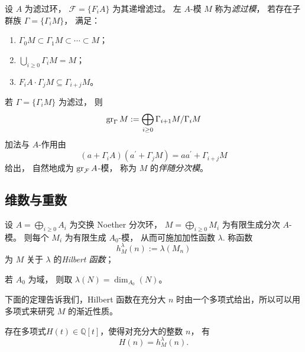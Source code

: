 \documentclass[12pt,a4paper]{ctexrep}   %
\begin{document}
\begin{definition}
    设 $A$ 为滤过环，
    $\mathcal{F}=\{F_iA\}$ 为其递增滤过。
    左 $A$-模 $M$ 称为\emph{滤过模}，
    若存在子群族 $\Gamma=\{\Gamma_iM\}$，
    满足：
    \begin{enumerate}[label=(\roman*)]
        \item
              $\Gamma_0M\subset \Gamma_1M\subset\cdots\subset M$；
        \item
              $\bigcup_{i\ge0}\Gamma_iM=M$；
        \item
              $F_iA\cdot\Gamma_jM\subseteq\Gamma_{i+j}M$。
    \end{enumerate}
\end{definition}

\begin{proposition}
    若 $\Gamma=\{\Gamma_iM\}$ 为滤过，
    则
    \[
        \operatorname{gr}_\Gamma M
        :=
        \bigoplus_{i\ge0}\Gamma_{i+1}M/\Gamma_iM
    \]
    加法与 $A$-作用由 \[
        (a+\Gamma_iA)(a^\prime+\Gamma_jM)
        =
        aa^\prime+\Gamma_{i+j}M
    \]
    给出，
    自然地成为 $\operatorname{gr}_{\mathcal{F}}A$-模，
    称为 $M$ 的\emph{伴随分次模}。
\end{proposition}


\subsection{维数与重数}


\begin{definition}
    \label{def:Hilbert 函数}
    设
    $A=\bigoplus_{i\ge0}A_i$
    为交换 Noether 分次环，
    $ M=\bigoplus_{i\ge0}M_i$
    为有限生成分次 $A$-模。
    则每个 $M_i$ 为有限生成 $A_0$-模，
    从而可施加加性函数 $\lambda$.
    称函数
    \[
        h_M^\lambda(n)
        :=
        \lambda(M_n)
    \]
    为 $M$ 关于 $\lambda$ 的\emph{Hilbert 函数}；

    \begin{remark}
        若 $A_0$ 为域， 则取 $\lambda(N)=\dim_{A_0}(N)$。
    \end{remark}
\end{definition}


下面的定理告诉我们，Hilbert 函数在充分大 $n$ 时由一个多项式给出，所以可以用多项式来研究 $M$ 的渐近性质。
\begin{theorem}
    存在多项式$H(t)\in\mathbb{Q}[t]$，使得对充分大的整数 $n$，
    有
    \begin{equation*}
        H(n)=h_M^\lambda(n).
    \end{equation*}
\end{theorem}
\end{document}
